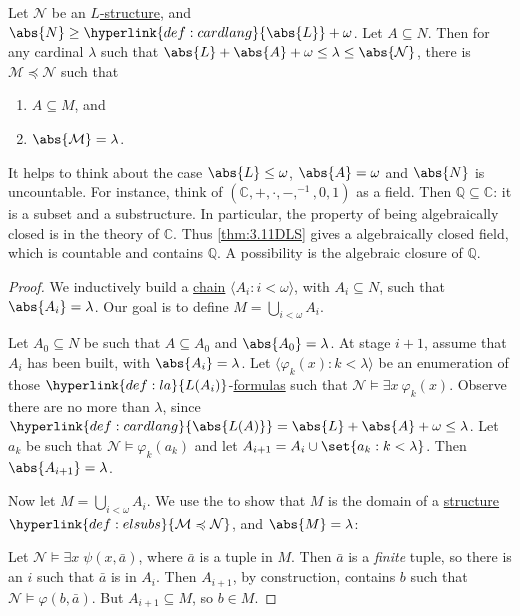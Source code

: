 \documentclass{article}
\let\models\vDash
\begin{document}
\begin{nthm}\label{thm:3.11DLS}
  Let $\mathcal{N}$ be an \hyperlink{def:str}{$L$-structure}, and $\abs{N} \geq \hyperlink{def:cardlang}{\abs{L}} + \omega$.
  Let $A \subseteq N$.
  Then for any cardinal $\lambda$ such that $\abs{L} + \abs{A} + \omega \leq \lambda \leq \abs{\mathcal{N}}$, there is \hyperlink{def:elsubs}{$\mathcal{M} \preccurlyeq \mathcal{N}$} such that
  \begin{enumerate}[label=(\roman*)]
    \item $A \subseteq M$, and
    \item $\abs{\mathcal{M}} = \lambda$.
  \end{enumerate}
\end{nthm}
It helps to think about the case $\abs{L} \leq \omega$, $\abs{A} = \omega$ and $\abs{N}$ is uncountable.
For instance, think of $(\mathbb{C}, + , \cdot, -, ^{-1}, 0,1)$ as a field.
Then $\mathbb{Q} \subseteq \mathbb{C}$: it is a subset and a substructure.
In particular, the property of being algebraically closed is in the theory of $\mathbb{C}$.
Thus \cref{thm:3.11DLS} gives a algebraically closed field, which is countable and contains $\mathbb{Q}$. A possibility is the algebraic closure of $\mathbb{Q}$.

\begin{proof}
  We inductively build a \hyperlink{def:chain}{chain} $\langle A_i  : i < \omega \rangle$, with $A_i \subseteq N$, such that $\abs{A_i} = \lambda$.
  Our goal is to define $M = \bigcup_{i < \omega} A_i$.

  Let $A_0 \subseteq N$ be such that $A \subseteq A_0$ and $\abs{A_0} = \lambda$.
  At stage $i+1$, assume that $A_i$ has been built, with $\abs{A_i} = \lambda$.
  Let $\langle \varphi_k(x) : k < \lambda  \rangle$ be an enumeration of those $\hyperlink{def:la}{L(A_i)}$-\hyperlink{def:form}{formulas} such that $\mathcal{N} \models \exists x \ \varphi_k(x)$. Observe there are no more than $\lambda$, since $\hyperlink{def:cardlang}{\abs{L(A)}} = \abs{L} + \abs{A} + \omega \leq \lambda$.
  Let $a_k$ be such that $\mathcal{N} \models \varphi_k(a_k)$ and let $A_{i+1} = A_i \cup \set{a_k : k < \lambda}$.
  Then $\abs{A_{i+1}} = \lambda$.

  Now let $M = \bigcup_{i < \omega} A_i$.
  We use the  to show that $M$ is the domain of a \hyperlink{def:str}{structure} $\hyperlink{def:elsubs}{\mathcal{M} \preccurlyeq \mathcal{N}}$, and $\abs{M} = \lambda$:

  Let $\mathcal{N} \models \exists x \; \psi(x,\bar{a})$, where $\bar{a}$ is a tuple in $M$.
  Then $\bar{a}$ is a \emph{finite} tuple, so there is an $i$ such that $\bar{a}$ is in $A_i$.
  Then $A_{i+1}$, by construction, contains $b$ such that $\mathcal{N} \models \varphi(b, \bar{a})$.
  But $A_{i+1} \subseteq M$, so $b \in M$.
\end{proof}
\end{document}

